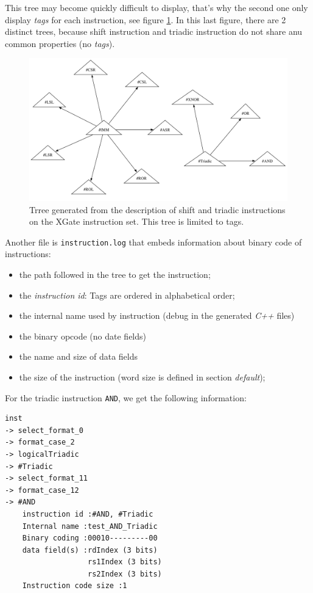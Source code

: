 This tree may become quickly difficult to display, that's why the second one only display \emph{tags} for each instruction, see figure \ref{fig:formatRefTest}. In this last figure, there are 2 distinct trees, because shift instruction and triadic instruction do not share anu common properties (no \emph{tags}).


\begin{figure}[h]		%
  \begin{center}
    \includegraphics[width=\linewidth]{../common/images/format_ref_test.pdf}
    \caption{Trree generated from the description of shift and triadic instructions on the XGate instruction set. This tree is limited to tags.}
    \label{fig:formatRefTest}
  \end{center}
\end{figure}

Another file is \texttt{instruction.log} that embeds information about binary code of instructions:
\begin{itemize}
\item the path followed in the tree to get the instruction;
\item the \emph{instruction id}: Tags are ordered in alphabetical order;
\item the internal name used by instruction (debug in the generated \emph{C++} files)
\item the binary opcode (no date fields)
\item the name and size of data fields
\item the size of the instruction (word size is defined in section \emph{default});
\end{itemize}

For the triadic instruction \texttt{AND}, we get the following information:
\begin{verbatim}
inst 
-> select_format_0 
-> format_case_2 
-> logicalTriadic 
-> #Triadic 
-> select_format_11 
-> format_case_12 
-> #AND
	instruction id :#AND, #Triadic
	Internal name :test_AND_Triadic
	Binary coding :00010---------00
	data field(s) :rdIndex (3 bits)
	               rs1Index (3 bits)
	               rs2Index (3 bits)
	Instruction code size :1
\end{verbatim}

